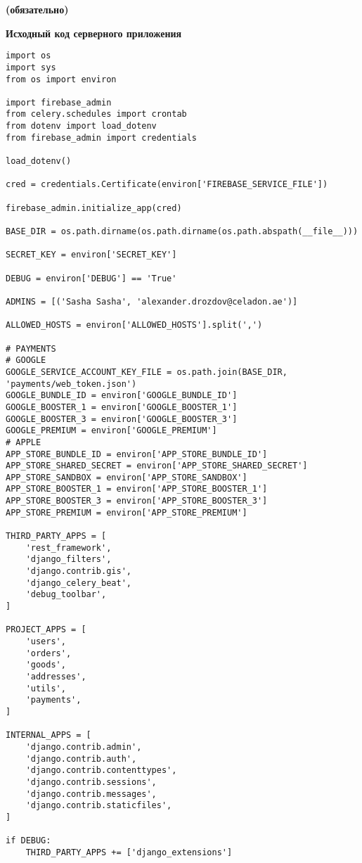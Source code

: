 \centerline{\bfseries (обязательно)}

\centerline{\bfseries Исходный код серверного приложения}

\begin{lstlisting}
import os
import sys
from os import environ

import firebase_admin
from celery.schedules import crontab
from dotenv import load_dotenv
from firebase_admin import credentials

load_dotenv()

cred = credentials.Certificate(environ['FIREBASE_SERVICE_FILE'])

firebase_admin.initialize_app(cred)

BASE_DIR = os.path.dirname(os.path.dirname(os.path.abspath(__file__)))

SECRET_KEY = environ['SECRET_KEY']

DEBUG = environ['DEBUG'] == 'True'

ADMINS = [('Sasha Sasha', 'alexander.drozdov@celadon.ae')]

ALLOWED_HOSTS = environ['ALLOWED_HOSTS'].split(',')

# PAYMENTS
# GOOGLE
GOOGLE_SERVICE_ACCOUNT_KEY_FILE = os.path.join(BASE_DIR, 'payments/web_token.json')
GOOGLE_BUNDLE_ID = environ['GOOGLE_BUNDLE_ID']
GOOGLE_BOOSTER_1 = environ['GOOGLE_BOOSTER_1']
GOOGLE_BOOSTER_3 = environ['GOOGLE_BOOSTER_3']
GOOGLE_PREMIUM = environ['GOOGLE_PREMIUM']
# APPLE
APP_STORE_BUNDLE_ID = environ['APP_STORE_BUNDLE_ID']
APP_STORE_SHARED_SECRET = environ['APP_STORE_SHARED_SECRET']
APP_STORE_SANDBOX = environ['APP_STORE_SANDBOX']
APP_STORE_BOOSTER_1 = environ['APP_STORE_BOOSTER_1']
APP_STORE_BOOSTER_3 = environ['APP_STORE_BOOSTER_3']
APP_STORE_PREMIUM = environ['APP_STORE_PREMIUM']

THIRD_PARTY_APPS = [
    'rest_framework',
    'django_filters',
    'django.contrib.gis',
    'django_celery_beat',
    'debug_toolbar',
]

PROJECT_APPS = [
    'users',
    'orders',
    'goods',
    'addresses',
    'utils',
    'payments',
]

INTERNAL_APPS = [
    'django.contrib.admin',
    'django.contrib.auth',
    'django.contrib.contenttypes',
    'django.contrib.sessions',
    'django.contrib.messages',
    'django.contrib.staticfiles',
]

if DEBUG:
    THIRD_PARTY_APPS += ['django_extensions']


\end{lstlisting}
